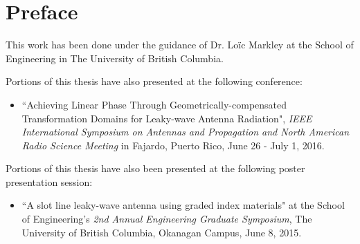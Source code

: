 \chapter{Preface}
This work has been done under the guidance of Dr. Lo\"ic Markley at the School of Engineering in The University of British Columbia. 

Portions of this thesis have also presented at the following conference:
\begin{itemize}
    \item ``Achieving Linear Phase Through Geometrically-compensated Transformation Domains for Leaky-wave Antenna Radiation",  \textit{IEEE International Symposium on Antennas and Propagation and North American Radio Science Meeting} in Fajardo, Puerto Rico, June 26 - July 1, 2016.
\end{itemize}

Portions of this thesis have also been presented at the following poster presentation session:
\begin{itemize}
    \item ``A slot line leaky-wave antenna using graded index materials" at the School of Engineering's \textit{2nd Annual Engineering Graduate Symposium}, The University of British Columbia, Okanagan Campus, June 8, 2015.
\end{itemize}

